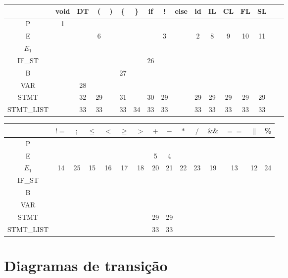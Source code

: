 \documentclass[]{article}
\numberwithin{equation}{section}
\begin{document}
\begin{center}
\begin{tabular}{|c|c|c|c|c|c|c|c|c|c|c|c|c|c|c|c|c|}
  \hline
  & void & DT & ( & ) & \{ & \} & if & ! & else & id & IL & CL & FL & SL \\ \hline
  P & 1 &  & &  & &  &  &  &  &  & & & & \\ \hline
  E &  &  & 6 &  &  &  &  & 3 &  & 2 & 8 & 9 & 10 & 11 \\ \hline
  $E_1$ &  &  & &  & & & & &  &  & & & & \\ \hline
  IF\_ST &  &  & &  &  & & 26 &  &   &  &  &  &  &  \\ \hline
  B & & & & & 27 & & & & & & & & & \\ \hline
  VAR & & 28 &  &  &  &  & & &  & &  & & & \\ \hline
  STMT & & 32 & 29 &  & 31 &  & 30&29 &  & 29&29  & 29& 29&29 \\ \hline
  STMT\_LIST & & 33 & 33 &  & 33 & 34 & 33& 33&  &33 & 33 & 33&33 & 33\\
  \hline
\end{tabular}
\end{center}

\begin{center}
\begin{tabular}{|c|c|c|c|c|c|c|c|c|c|c|c|c|c|c|}
  \hline
  & $!=$ & $;$ & $\leq$ & $<$ & $\geq$ & $>$ & $+$ & $-$ & $*$ & $/$ & $\&\&$ & $==$ & $||$ & \% \\ \hline
  P &  & &  &  &  &  &  &  & & & & & & \\ \hline
  E &  & &  &  &  &  & 5 & 4 & & & & & & \\ \hline
  $E_1$ & 14 & 25& 15 & 16 & 17 & 18 & 20 & 21 & 22& 23& 19& 13&12 &24 \\ \hline
  IF\_ST &  & &  &  &  &  &  &  & & & & & & \\ \hline
  B &  & &  &  &  &  &  &  & & & & & & \\ \hline
  VAR &  & &  &  &  &  &  &  & & & & & & \\ \hline
  STMT &  & &  &  &  &  & 29 & 29 & & & & & & \\ \hline
  STMT\_LIST &  & &  &  &  &  &33  & 33 & & & & & & \\
  \hline
\end{tabular}
\end{center}

\newpage

\section{Diagramas de transição}
\end{document}
